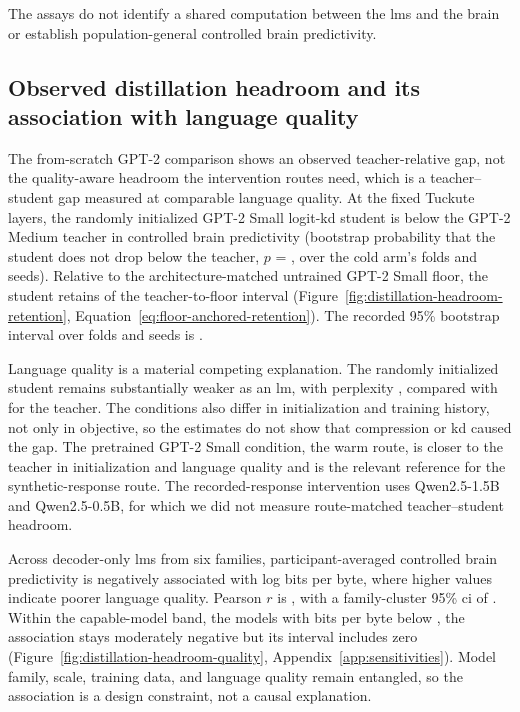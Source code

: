 The assays do not identify a shared computation between the \acp{lm} and the brain or establish population-general controlled brain predictivity.

\subsection{Observed distillation headroom and its association with language quality}
\label{sec:results-headroom}

The from-scratch GPT-2 comparison shows an observed teacher-relative gap, not the quality-aware headroom the intervention routes need, which is a teacher--student gap measured at comparable language quality.
At the fixed Tuckute layers, the randomly initialized GPT-2 Small logit-\ac{kd} student is  below the GPT-2 Medium teacher in controlled brain predictivity (bootstrap probability that the student does not drop below the teacher, \(p\) = , over the cold arm's folds and seeds).
Relative to the architecture-matched untrained GPT-2 Small floor, the student retains  of the teacher-to-floor interval (Figure~\ref{fig:distillation-headroom-retention}, Equation~\ref{eq:floor-anchored-retention}).
The recorded 95\% bootstrap interval over folds and seeds is .

Language quality is a material competing explanation.
The randomly initialized student remains substantially weaker as an \ac{lm}, with perplexity , compared with  for the teacher.
The conditions also differ in initialization and training history, not only in objective, so the estimates do not show that compression or \ac{kd} caused the gap.
The pretrained GPT-2 Small condition, the warm route, is closer to the teacher in initialization and language quality and is the relevant reference for the synthetic-response route.
The recorded-response intervention uses Qwen2.5-1.5B and Qwen2.5-0.5B, for which we did not measure route-matched teacher--student headroom.

Across  decoder-only \acp{lm} from six families, participant-averaged controlled brain predictivity is negatively associated with log bits per byte, where higher values indicate poorer language quality.
Pearson \(r\) is , with a family-cluster 95\% \ac{ci} of .
Within the capable-model band, the  models with bits per byte below , the association stays moderately negative but its interval includes zero (Figure~\ref{fig:distillation-headroom-quality}, Appendix~\ref{app:sensitivities}).
Model family, scale, training data, and language quality remain entangled, so the association is a design constraint, not a causal explanation.

